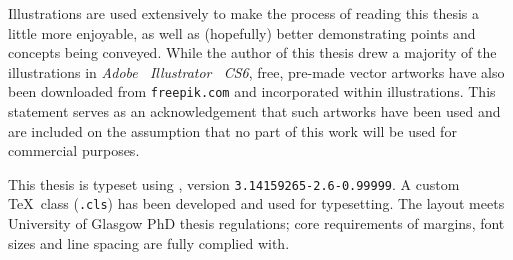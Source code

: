 \begin{preamble}
\noindent{}
Illustrations are used extensively to make the process of reading this thesis a little more enjoyable, as well as (hopefully) better demonstrating points and concepts being conveyed. While the author of this thesis drew a majority of the illustrations in \emph{Adobe \textregistered~Illustrator \textregistered~CS6}, free, pre-made vector artworks have also been downloaded from \texttt{freepik.com} and incorporated within illustrations. This statement serves as an acknowledgement that such artworks have been used and are included on the assumption that no part of this work will be used for commercial purposes.

\noindent{}
This thesis is typeset using \XeTeX, version \texttt{3.14159265-2.6-0.99999}. A custom \TeX\ class (\texttt{.cls}) has been developed and used for typesetting. The layout meets University of Glasgow PhD thesis regulations; core requirements of margins, font sizes and line spacing are fully complied with.

\end{preamble}

\newpage
\thispagestyle{empty}
\mbox{}
\newpage
\thispagestyle{empty}
\mbox{}
\newpage